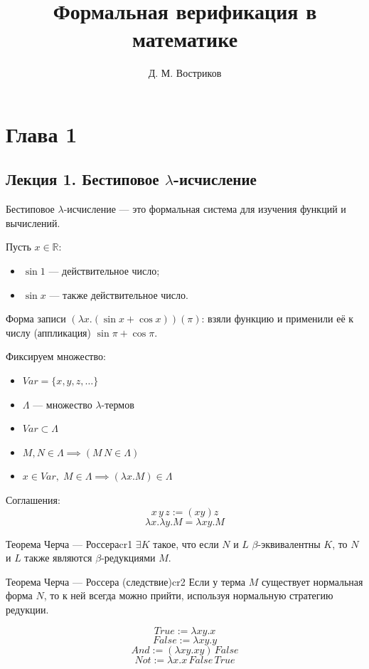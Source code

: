 \documentclass[12pt]{report}
\author{Д. М. Востриков}
\title{Формальная верификация в математике}
\date{\the\year}
\begin{document}
\maketitle
\tableofcontents

\newpage

\chapter{Глава 1}
\section{Лекция 1. Бестиповое \texorpdfstring{$\lambda$}{λ}-исчисление}

\begin{definition}
Бестиповое $\lambda$-исчисление --- это формальная система для изучения функций и вычислений.
\end{definition}

Пусть $x \in \mathbb{R}$:
\begin{itemize}
    \item $\sin{1}$ --- действительное число;
    \item $\sin{x}$ --- также действительное число.
\end{itemize}

Форма записи $(\lambda x.(\sin{x}+\cos{x}))(\pi)$: взяли функцию и применили её к числу (аппликация) $\sin{\pi} + \cos{\pi}$.

Фиксируем множество:
\begin{itemize}
    \item $Var = \{x, y, z, \dots\}$
    \item $\Lambda$ --- множество $\lambda$-термов
    \item $Var \subset \Lambda$
    \item $M, N \in \Lambda \implies (M \, N \in \Lambda)$
    \item $x \in Var, \; M \in \Lambda \implies (\lambda x. M) \in \Lambda$
\end{itemize}

Соглашения: 
\[ x \, y \, z := (xy)z \]
\[ \lambda x. \lambda y. M = \lambda xy. M \]

\begin{theorem}{Теорема Черча — Россера}{cr1}
$\exists K$ такое, что если $N$ и $L$ $\beta$-эквивалентны $K$, то $N$ и $L$ также являются $\beta$-редукциями $M$.
\end{theorem}

\begin{theorem}{Теорема Черча — Россера (следствие)}{cr2}
Если у терма $M$ существует нормальная форма $N$, то к ней всегда можно прийти, используя нормальную стратегию редукции.
\end{theorem}

\[ True := \lambda x y. x \]
\[ False := \lambda x y. y \]
\[ And := (\lambda x y. x y)\, False \]
\[ Not := \lambda x. x \, False \, True \]
\end{document}

